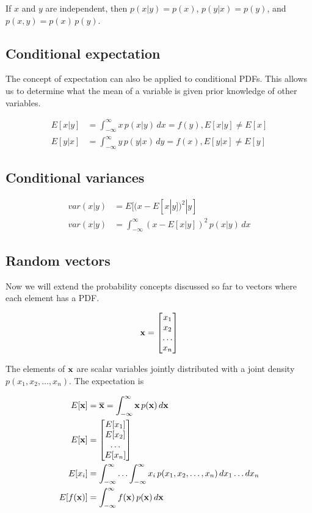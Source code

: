 If $x$ and $y$ are independent, then $p(x|y) = p(x)$, $p(y|x) = p(y)$, and
$p(x, y) = p(x) \,p(y)$.

\subsection{Conditional expectation}

The concept of expectation can also be applied to conditional PDFs. This allows
us to determine what the mean of a variable is given prior knowledge of other
variables.

\begin{align*}
  E[x|y] &= \int_{-\infty}^\infty x \,p(x|y) \,dx = f(y), E[x|y] \neq E[x] \\
  E[y|x] &= \int_{-\infty}^\infty y \,p(y|x) \,dy = f(x), E[y|x] \neq E[y]
\end{align*}

\subsection{Conditional variances}

\begin{align*}
  var(x|y) &= E[(x - E[x|y])^2|y] \\
  var(x|y) &= \int_{-\infty}^\infty (x - E[x|y])^2 \,p(x|y) \,dx
\end{align*}

\subsection{Random vectors}

Now we will extend the probability concepts discussed so far to vectors where
each element has a PDF.

\begin{equation*}
  \mathbf{x} = \begin{bmatrix}
    x_1 \\
    x_2 \\
    \ldots \\
    x_n
  \end{bmatrix}
\end{equation*}

The elements of $\mathbf{x}$ are scalar variables jointly distributed with a joint
density $p(x_1, x_2, \ldots, x_n)$. The expectation is

\begin{align*}
  E[\mathbf{x}] &= \overline{\mathbf{x}} = \int_{-\infty}^\infty \mathbf{x} \,p(\mathbf{x})
    \,d\mathbf{x} \\
  E[\mathbf{x}] &= \begin{bmatrix}
    E[x_1] \\
    E[x_2] \\
    \ldots \\
    E[x_n]
  \end{bmatrix} \\
  E[x_i] &= \int_{-\infty}^\infty \ldots \int_{-\infty}^\infty x_i
    \,p(x_1, x_2, \ldots, x_n) \,dx_1 \ldots dx_n \\
  E[f(\mathbf{x})] &= \int_{-\infty}^\infty f(\mathbf{x}) \,p(\mathbf{x}) \,d\mathbf{x}
\end{align*}

